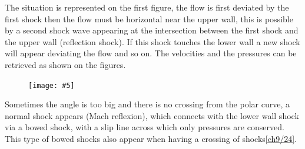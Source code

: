 \documentclass[british,french,11pt, a4paper, openany]{article}
\newcommand{\wrapfig}[6]{%
	\begin{figure}%
		\vspace{-5mm}%
		\texttt{[image: \#5]}%
		\captionof{figure}{}%
		\label{#6}%
	\end{figure}%
}
\begin{document}
\begin{center}
\begin{minipage}{0.25\textwidth}
	\end{minipage}
\end{center}

The situation is represented on the first figure, the flow is first deviated by the first shock then the flow must be horizontal near the upper wall, this is possible by a second shock wave appearing at the intersection between the first shock and the upper wall (reflection shock). If this shock touches the lower wall a new shock will appear deviating the flow and so on. The velocities and the pressures can be retrieved as shown on the figures.

\wrapfig{10}{r}{10}{0.30}{ch9/24}{ch9/24}
Sometimes  the angle is too big and there is no crossing  from the polar curve, a normal shock appears (Mach reflexion), which connects with the lower wall shock via a bowed shock, with a slip line across which only pressures are conserved. This type of bowed shocks also appear when having a crossing of shocks\autoref{ch9/24}.
\end{document}
